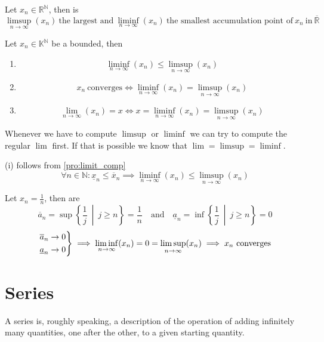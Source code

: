 \begin{theorem}
   Let \(x_n \in \mathbb{R}^\mathbb{N}\), then is
   \[\limsup_{n \to \infty}(x_n)~\text{the largest and}~\liminf_{n \to \infty}(x_n)~\text{the smallest accumulation point of}~x_n~\text{in}~\overline{\mathbb{R}}\]
\end{theorem}

\begin{theorem}\label{thm:limsup_inf_rules}
   Let \(x_n \in \mathbb{K}^\mathbb{N}\) be a bounded, then
   \begin{enumerate}[label=\roman*, align=Center]
      \item \[\liminf_{n \to \infty}(x_n) \leq \limsup_{n \to \infty}(x_n)\]
      \item \[x_n~\text{converges} \iff \liminf_{n \to \infty}(x_n) = \limsup_{n \to \infty}(x_n)\]
         \item \[\lim_{n \to \infty}(x_n) = x \iff x = \liminf_{n \to \infty}(x_n) = \limsup_{n \to \infty}(x_n)\]
   \end{enumerate}
\end{theorem}
\begin{remark}[Tips]
   Whenever we have to compute \(\limsup\) or \(\liminf\) we can try to compute the regular \(\lim\) first.
   If that is possible we know that \(\lim = \limsup = \liminf\).
\end{remark}
\begin{remark}
   (i) follows from \cref{pro:limit_comp}
   \[\forall n \in \mathbb{N}: \underline{x}_n \leq \overline{x}_n \implies \liminf_{n \to \infty}(x_n) \leq \limsup_{n \to \infty}(x_n)\]
\end{remark}
\begin{example}
   Let \(x_n = \frac{1}{n}\), then are
   \[\overline{a}_n = \sup\left\{\frac{1}{j}~\middle|~j \geq n\right\} = \frac{1}{n} \quad\text{and}\quad \underline{a}_n = \inf\left\{\frac{1}{j}~\middle|~j \geq n\right\} = 0\]
   \[\begin{drcases}
      \overline{a}_n \to 0\\
      \underline{a}_n \to 0
   \end{drcases} \implies \liminf_{n \to \infty}(x_n) = 0 = \limsup_{n \to \infty}(x_n) \implies x_n~\text{converges}\]
\end{example}

\newpage

\section{Series}
A series is, roughly speaking, a description of the operation of adding infinitely many quantities, one after the other, to a given starting quantity.

